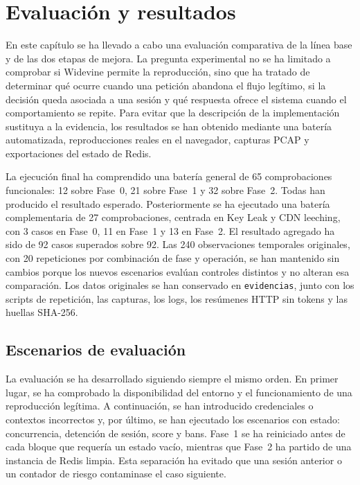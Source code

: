 
\chapter{Evaluación y resultados}

En este capítulo se ha llevado a cabo una evaluación comparativa de la línea base y de las dos etapas de mejora. La pregunta experimental no se ha limitado a comprobar si Widevine permite la reproducción, sino que ha tratado de determinar qué ocurre cuando una petición abandona el flujo legítimo, si la decisión queda asociada a una sesión y qué respuesta ofrece el sistema cuando el comportamiento se repite. Para evitar que la descripción de la implementación sustituya a la evidencia, los resultados se han obtenido mediante una batería automatizada, reproducciones reales en el navegador, capturas PCAP y exportaciones del estado de Redis.

La ejecución final ha comprendido una batería general de 65 comprobaciones funcionales: 12 sobre Fase~0, 21 sobre Fase~1 y 32 sobre Fase~2. Todas han producido el resultado esperado. Posteriormente se ha ejecutado una batería complementaria de 27 comprobaciones, centrada en Key Leak y CDN leeching, con 3 casos en Fase~0, 11 en Fase~1 y 13 en Fase~2. El resultado agregado ha sido de 92 casos superados sobre 92. Las 240 observaciones temporales originales, con 20 repeticiones por combinación de fase y operación, se han mantenido sin cambios porque los nuevos escenarios evalúan controles distintos y no alteran esa comparación. Los datos originales se han conservado en \nolinkurl{evidencias}, junto con los scripts de repetición, las capturas, los logs, los resúmenes HTTP sin tokens y las huellas SHA-256.

\section{Escenarios de evaluación}

La evaluación se ha desarrollado siguiendo siempre el mismo orden. En primer lugar, se ha comprobado la disponibilidad del entorno y el funcionamiento de una reproducción legítima. A continuación, se han introducido credenciales o contextos incorrectos y, por último, se han ejecutado los escenarios con estado: concurrencia, detención de sesión, score y bans. Fase~1 se ha reiniciado antes de cada bloque que requería un estado vacío, mientras que Fase~2 ha partido de una instancia de Redis limpia. Esta separación ha evitado que una sesión anterior o un contador de riesgo contaminase el caso siguiente.

